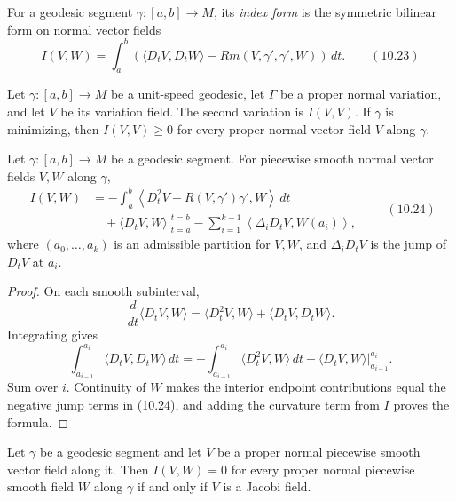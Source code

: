 For a geodesic segment $\gamma:[a,b]\to M$, its \emph{index form} is the
symmetric bilinear form on normal vector fields
\[
I(V,W)=\int_a^b
\left(
\langle D_tV,D_tW\rangle-Rm(V,\gamma',\gamma',W)
\right)\,dt.
\qquad (10.23)
\]

\begin{corollary}
\label{cor:second-variation-minimizing-geodesic}

Let $\gamma:[a,b]\to M$ be a unit-speed geodesic, let $\Gamma$ be a proper
normal variation, and let $V$ be its variation field. The second variation is
$I(V,V)$. If $\gamma$ is minimizing, then
$I(V,V)\geq0$ for every proper normal vector field $V$ along $\gamma$.
\end{corollary}

\begin{proposition}
\label{prop:index-form-jacobi-equation}

Let $\gamma:[a,b]\to M$ be a geodesic segment. For piecewise smooth normal
vector fields $V,W$ along $\gamma$,
\[
\begin{aligned}
I(V,W)
&=-\int_a^b
\left\langle D_t^2V+R(V,\gamma')\gamma',W\right\rangle\,dt\\
&\quad+\left.\langle D_tV,W\rangle\right|_{t=a}^{t=b}
-\sum_{i=1}^{k-1}\left\langle\Delta_iD_tV,W(a_i)\right\rangle,
\end{aligned}
\qquad (10.24)
\]
where $(a_0,\ldots,a_k)$ is an admissible partition for $V,W$, and
$\Delta_iD_tV$ is the jump of $D_tV$ at $a_i$.

\begin{proof}
\sketch On each smooth subinterval,
\[
\frac d{dt}\langle D_tV,W\rangle
=\langle D_t^2V,W\rangle+\langle D_tV,D_tW\rangle.
\]
Integrating gives
\[
\int_{a_{i-1}}^{a_i}\langle D_tV,D_tW\rangle\,dt
=-\int_{a_{i-1}}^{a_i}\langle D_t^2V,W\rangle\,dt
+\left.\langle D_tV,W\rangle\right|_{a_{i-1}}^{a_i}.
\]
Sum over $i$. Continuity of $W$ makes the interior endpoint contributions
equal the negative jump terms in (10.24), and adding the curvature term from
$I$ proves the formula.
\end{proof}
\end{proposition}

\begin{corollary}
\label{cor:jacobi-field-index-form}

Let $\gamma$ be a geodesic segment and let $V$ be a proper normal piecewise
smooth vector field along it. Then
$I(V,W)=0$ for every proper normal piecewise smooth field $W$ along $\gamma$
if and only if $V$ is a Jacobi field.
\end{corollary}
